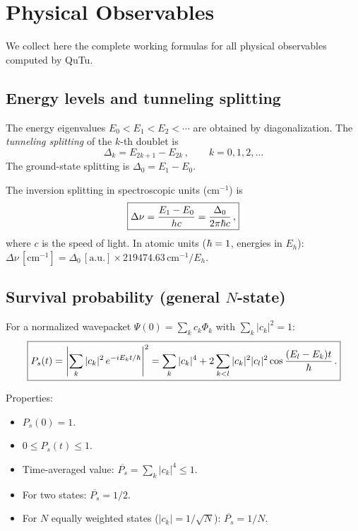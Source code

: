 \section{Physical Observables}\label{sec:observables}

We collect here the complete working formulas for all physical observables computed by QuTu.

\subsection{Energy levels and tunneling splitting}

The energy eigenvalues $E_0 < E_1 < E_2 < \cdots$ are obtained by diagonalization.
The \emph{tunneling splitting} of the $k$-th doublet is
\begin{equation}
  \boxed{\Delta_k = E_{2k+1} - E_{2k}\,,\qquad k = 0, 1, 2, \ldots}
\end{equation}
The ground-state splitting is $\Delta_0 = E_1 - E_0$.

The inversion splitting in spectroscopic units (cm$^{-1}$) is
\begin{equation}
  \boxed{\Delta\nu = \frac{E_1 - E_0}{hc} = \frac{\Delta_0}{2\pi\hbar c}\,,}
\end{equation}
where $c$ is the speed of light. In atomic units ($\hbar = 1$, energies in $E_h$):
$\Delta\nu\,[\text{cm}^{-1}] = \Delta_0\,[\text{a.u.}] \times 219474.63\,\text{cm}^{-1}/E_h$.

\subsection{Survival probability (general $N$-state)}\label{sec:Ps_general}

For a normalized wavepacket $\Psi(0) = \sum_k c_k\Phi_k$ with $\sum_k|c_k|^2 = 1$:
\begin{equation}\label{eq:Ps_general}
  \boxed{P_s(t) = \left|\sum_k |c_k|^2\,e^{-iE_k t/\hbar}\right|^2
  = \sum_k |c_k|^4 + 2\sum_{k<l}|c_k|^2|c_l|^2\cos\frac{(E_l-E_k)t}{\hbar}\,.}
\end{equation}

Properties:
\begin{itemize}
  \item $P_s(0) = 1$.
  \item $0 \leq P_s(t) \leq 1$.
  \item Time-averaged value: $\overline{P_s} = \sum_k |c_k|^4 \leq 1$.
  \item For two states: $\overline{P_s} = 1/2$.
  \item For $N$ equally weighted states ($|c_k| = 1/\sqrt{N}$): $\overline{P_s} = 1/N$.
\end{itemize}

